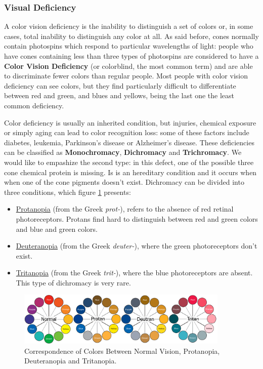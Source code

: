 \subsubsection{Visual Deficiency}
\label{subsubsec:visual_deficiencies}
%
A color vision deficiency is the inability to distinguish a set of colors or, in some cases, total
inability to distinguish any color at all. As said before, cones normally contain photospins which respond
to particular wavelengths of light: people who have cones containing less than three types of photospins are considered to have a \textbf{Color Vision Deficiency} (or colorblind, the most common term)
and are able to discriminate fewer colors than regular people. Most people with color vision deficiency can
see colors, but they find particularly difficult to differentiate between red and green, and blues and
yellows, being the last one the least common deficiency. \par
Color deficiency is usually an inherited condition, but injuries, chemical exposure or simply aging can lead to color
recognition loss: some of these factors include diabetes, leukemia, Parkinson’s disease or Alzheimer’s
disease. These deficiencies can be classified as \textbf{Monochromacy}, \textbf{Dichromacy} and \textbf{Trichromacy}.
We would like to empashize the second type: in this defect, one of the possible three cone chemical protein is
missing. Is is an hereditary condition and it occurs when when one of the cone pigments doesn’t exist.
Dichromacy can be divided into three conditions, which figure \ref{fig:correscolorblind} presents: \par
%
\begin{itemize}
	\setlength\itemsep{0.01em}
	\item \ul{Protanopia} (from the Greek \emph{prot-}), refers to the absence of red retinal
    photoreceptors.
    Protans find hard to distinguish between red and green colors and blue and green colors.
  \item \ul{Deuteranopia} (from the Greek \emph{deuter-}), where the green photoreceptors don’t
    exist.
  \item \ul{Tritanopia} (from the Greek \emph{trit-}), where the blue photoreceptors are absent.
    This type of dichromacy is very rare.
\end{itemize} \par
%
\begin{figure}[H]
	\centering
    \vspace{-10pt}
    \includegraphics[width=0.9\textwidth]{images/background/ColorBlindnessCorrespondance.png}
    \caption[Correspondance of Colors Between Visual Deficiencies]{Correspondence of Colors Between Normal Vision,
    Protanopia, Deuteranopia and Tritanopia.\protect\footnotemark{}}
    \vspace{-10pt}
    \label{fig:correscolorblind}
\end{figure}
